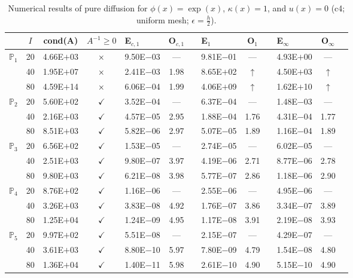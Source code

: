 \begin{table}[H]
\centering
\caption{Numerical results of pure diffusion for $\phi(x)=\exp(x)$, $\kappa(x)=1$, and $u(x)=0$ (c4; uniform mesh; $\epsilon=\frac{h}{2}$).}
\begin{tabular}{@{}l c c c l c c l c c l c c@{}}
\toprule
 & $I$ & cond(A) & $A^{-1}\geq 0$ &  E$_{c,1}$ & O$_{c,1}$ && E$_1$ & O$_1$ && E$_{\infty}$ & O$_{\infty}$\\
\midrule
\multirow{3}{*}{$\mathbb{P}_{1}$}
 & 20 & 4.66E$+$03 & $\times$ & 9.50E$-$03 & --- && 9.81E$-$01 & --- && 4.93E$+$00 & ---\\
 & 40 & 1.95E$+$07 & $\times$ & 2.41E$-$03 & 1.98 && 8.65E$+$02 & $\uparrow$ && 4.50E$+$03 & $\uparrow$\\
 & 80 & 4.59E$+$14 & $\times$ & 6.06E$-$04 & 1.99 && 4.06E$+$09 & $\uparrow$ && 1.62E$+$10 & $\uparrow$\\
\midrule
\multirow{3}{*}{$\mathbb{P}_{2}$}
 & 20 & 5.60E$+$02 & $\checkmark$ & 3.52E$-$04 & --- && 6.37E$-$04 & --- && 1.48E$-$03 & ---\\
 & 40 & 2.16E$+$03 & $\checkmark$ & 4.57E$-$05 & 2.95 && 1.88E$-$04 & 1.76 && 4.31E$-$04 & 1.77\\
 & 80 & 8.51E$+$03 & $\checkmark$ & 5.82E$-$06 & 2.97 && 5.07E$-$05 & 1.89 && 1.16E$-$04 & 1.89\\
\midrule
\multirow{3}{*}{$\mathbb{P}_{3}$}
 & 20 & 6.56E$+$02 & $\checkmark$ & 1.53E$-$05 & --- && 2.74E$-$05 & --- && 6.02E$-$05 & ---\\
 & 40 & 2.51E$+$03 & $\checkmark$ & 9.80E$-$07 & 3.97 && 4.19E$-$06 & 2.71 && 8.77E$-$06 & 2.78\\
 & 80 & 9.80E$+$03 & $\checkmark$ & 6.21E$-$08 & 3.98 && 5.77E$-$07 & 2.86 && 1.18E$-$06 & 2.90\\
\midrule
\multirow{3}{*}{$\mathbb{P}_{4}$}
 & 20 & 8.76E$+$02 & $\checkmark$ & 1.16E$-$06 & --- && 2.55E$-$06 & --- && 4.95E$-$06 & ---\\
 & 40 & 3.26E$+$03 & $\checkmark$ & 3.83E$-$08 & 4.92 && 1.76E$-$07 & 3.86 && 3.34E$-$07 & 3.89\\
 & 80 & 1.25E$+$04 & $\checkmark$ & 1.24E$-$09 & 4.95 && 1.17E$-$08 & 3.91 && 2.19E$-$08 & 3.93\\
\midrule
\multirow{3}{*}{$\mathbb{P}_{5}$}
 & 20 & 9.97E$+$02 & $\checkmark$ & 5.51E$-$08 & --- && 2.15E$-$07 & --- && 4.29E$-$07 & ---\\
 & 40 & 3.61E$+$03 & $\checkmark$ & 8.80E$-$10 & 5.97 && 7.80E$-$09 & 4.79 && 1.54E$-$08 & 4.80\\
 & 80 & 1.36E$+$04 & $\checkmark$ & 1.40E$-$11 & 5.98 && 2.61E$-$10 & 4.90 && 5.15E$-$10 & 4.90\\
\bottomrule
\end{tabular}
\end{table}